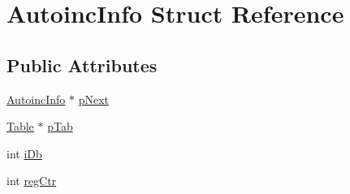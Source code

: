 \hypertarget{struct_autoinc_info}{\section{Autoinc\-Info Struct Reference}
\label{struct_autoinc_info}
}
\subsection*{Public Attributes}
\begin{DoxyCompactItemize}
\item 
\hyperlink{struct_autoinc_info}{Autoinc\-Info} $\ast$ \hyperlink{struct_autoinc_info_aa77fb076beea013c25df4e49dba4b6f6}{p\-Next}
\item 
\hyperlink{struct_table}{Table} $\ast$ \hyperlink{struct_autoinc_info_a0cf785b0cbaddb4215a8408f8e13075e}{p\-Tab}
\item 
int \hyperlink{struct_autoinc_info_ae7234e0916b11ef97377bdfd6c7c4568}{i\-Db}
\item 
int \hyperlink{struct_autoinc_info_af180977ee7dcc8cab862185692f57cc5}{reg\-Ctr}
\end{DoxyCompactItemize}


